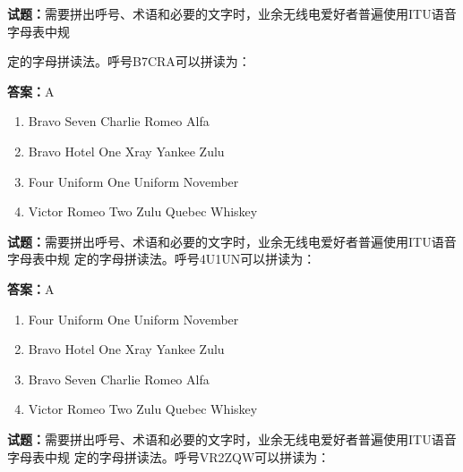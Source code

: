 \documentclass{ctexbook}
\begin{document}




\vspace{1em}

\textbf{试题：}需要拼出呼号、术语和必要的文字时，业余无线电爱好者普遍使用ITU语音字母表中规


定的字母拼读法。呼号B7CRA可以拼读为： 

\textbf{答案：}A 

\begin{enumerate}[leftmargin=3em]
  \item Bravo Seven Charlie Romeo Alfa 

  \item Bravo Hotel One Xray Yankee Zulu 

  \item Four Uniform One Uniform November 

  \item Victor Romeo Two Zulu Quebec Whiskey 

\end{enumerate}





\vspace{1em}

\textbf{试题：}需要拼出呼号、术语和必要的文字时，业余无线电爱好者普遍使用ITU语音字母表中规
定的字母拼读法。呼号4U1UN可以拼读为： 

\textbf{答案：}A 

\begin{enumerate}[leftmargin=3em]
  \item Four Uniform One Uniform November 

  \item Bravo Hotel One Xray Yankee Zulu 

  \item Bravo Seven Charlie Romeo Alfa 

  \item Victor Romeo Two Zulu Quebec Whiskey 

\end{enumerate}





\vspace{1em}

\textbf{试题：}需要拼出呼号、术语和必要的文字时，业余无线电爱好者普遍使用ITU语音字母表中规
定的字母拼读法。呼号VR2ZQW可以拼读为： 
\end{document}
